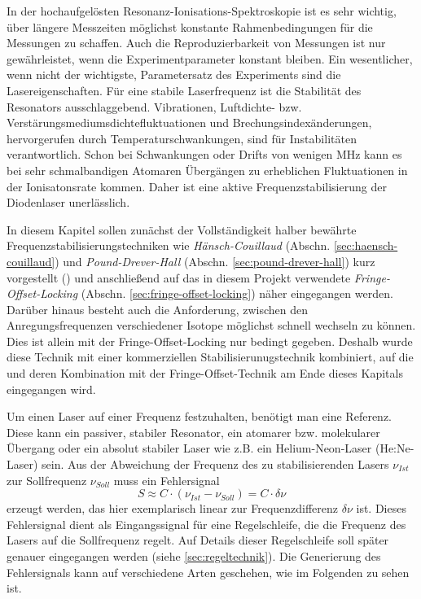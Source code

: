 In der hochaufgelösten Resonanz-Ionisations-Spektroskopie ist es
sehr wichtig, über längere Messzeiten möglichst konstante Rahmenbedingungen für
die Messungen zu schaffen. Auch die Reproduzierbarkeit von Messungen ist nur
gewährleistet, wenn die Experimentparameter konstant bleiben. Ein wesentlicher, wenn nicht der
wichtigste, Parametersatz des Experiments sind die Lasereigenschaften. Für
eine stabile Laserfrequenz ist die Stabilität des Resonators ausschlaggebend.
Vibrationen, Luftdichte- bzw. Verstärungsmediumsdichtefluktuationen und
Brechungsindexänderungen, hervorgerufen durch Temperaturschwankungen, sind für
Instabilitäten verantwortlich. Schon bei Schwankungen oder Drifts von wenigen
MHz kann es bei sehr schmalbandigen Atomaren Übergängen zu erheblichen
Fluktuationen in der Ionisatonsrate kommen. Daher ist eine aktive
Frequenzstabilisierung der Diodenlaser unerlässlich.\par
In diesem Kapitel sollen zunächst der Vollständigkeit halber bewährte
Frequenzstabilisierungstechniken wie
\textit{Hänsch-Couillaud} (Abschn.
\ref{sec:haensch-couillaud}) und \textit{Pound-Drever-Hall} (Abschn.
\ref{sec:pound-drever-hall}) kurz vorgestellt
(\cite{noertershaeuser:physik_des_lasers}) und anschließend auf das
in diesem Projekt verwendete \textit{Fringe-Offset-Locking} (Abschn.
\ref{sec:fringe-offset-locking}) näher eingegangen werden. Darüber hinaus
besteht auch die Anforderung, zwischen den Anregungsfrequenzen verschiedener
Isotope möglichst schnell wechseln zu können. Dies ist allein mit der
Fringe-Offset-Locking nur bedingt gegeben. Deshalb wurde diese Technik mit einer
kommerziellen Stabilisierunugstechnik kombiniert, auf die und deren Kombination
mit der Fringe-Offset-Technik am Ende dieses Kapitals eingegangen wird.\par
Um einen Laser auf einer Frequenz festzuhalten, benötigt
man eine Referenz. Diese kann ein passiver, stabiler Resonator, ein atomarer
bzw. molekularer Übergang oder ein absolut stabiler Laser wie z.B. ein
Helium-Neon-Laser (He:Ne-Laser) sein.
Aus der Abweichung der Frequenz des zu stabilisierenden Lasers $\nu_{Ist}$ zur
Sollfrequenz $\nu_{Soll}$ muss ein Fehlersignal
\begin{equation}\label{eq:servoschleife_fehlersignal}
	S\approx C\cdot(\nu_{Ist}-\nu_{Soll})=C\cdot\delta\nu
\end{equation}
erzeugt werden, das hier exemplarisch linear zur Frequenzdifferenz $\delta\nu$
ist. Dieses Fehlersignal dient als Eingangssignal für eine Regelschleife, die
die Frequenz des Lasers auf die Sollfrequenz regelt. Auf Details dieser
Regelschleife soll später genauer eingegangen werden (siehe
\ref{sec:regeltechnik}). Die Generierung des Fehlersignals kann auf verschiedene Arten geschehen, wie im Folgenden zu sehen
ist.

